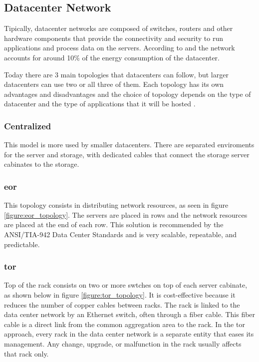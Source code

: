 \subsection{Datacenter Network}

Tipically, datacenter networks are composed of switches, routers and other hardware components that provide the connectivity and security to run applications and process data on the servers. 
According to \citet{Cheung} and \citet{Miyuru} the network accounts for around 10\% of the energy consumption of the datacenter. 

Today there are 3 main topologies that datacenters can follow, but larger datacenters can use two or all three of them. Each topology has its own advantages and disadvantages and the choice of topology depends on the type of datacenter and the type of applications that it will be hosted \citet{commScope}.

\subsubsection{Centralized}

This model is more used by smaller datacenters. There are separated enviroments for the server and storage, with dedicated  cables that connect the storage server cabinates to the storage.  

\subsubsection{\ac{eor}}

This topology consists in distributing network resources, as seen in figure \ref{figure:eor_topology}. The servers are placed in rows and the network resources are placed at the end of each row. This solution is recommended by the  ANSI/TIA-942 Data Center Standards \cite{ANSI/TIA-942} and is very scalable, repeatable, and predictable.

\subsubsection{\ac{tor}}

Top of the rack consists on two or more swtches on top of each server cabinate, as shown below in figure \ref{figure:tor_topology}. It is cost-effective because it reduces the number of copper cables between racks. The rack is linked to the data center network by an Ethernet switch, often through a fiber cable. This fiber cable is a direct link from the common aggregation area to the rack.
In the \ac{tor} approach, every rack in the data center network is a separate entity that eases its management. Any change, upgrade, or malfunction in the rack usually affects that rack only.

